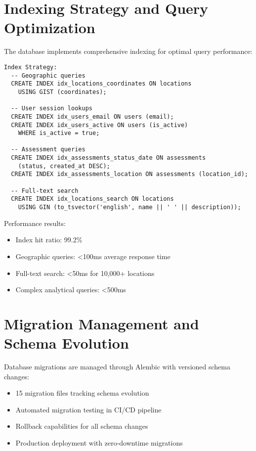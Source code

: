 \documentclass[a4paper,12pt,oneside]{book}
\begin{document}
\section{Indexing Strategy and Query Optimization}

The database implements comprehensive indexing for optimal query performance:

\begin{lstlisting}[language=Pseudocode, caption=Strategic Index Implementation]
Index Strategy:
  -- Geographic queries
  CREATE INDEX idx_locations_coordinates ON locations 
    USING GIST (coordinates);
  
  -- User session lookups  
  CREATE INDEX idx_users_email ON users (email);
  CREATE INDEX idx_users_active ON users (is_active) 
    WHERE is_active = true;
  
  -- Assessment queries
  CREATE INDEX idx_assessments_status_date ON assessments 
    (status, created_at DESC);
  CREATE INDEX idx_assessments_location ON assessments (location_id);
  
  -- Full-text search
  CREATE INDEX idx_locations_search ON locations 
    USING GIN (to_tsvector('english', name || ' ' || description));
\end{lstlisting}

Performance results:
\begin{itemize}
    \item Index hit ratio: 99.2\%
    \item Geographic queries: <100ms average response time
    \item Full-text search: <50ms for 10,000+ locations
    \item Complex analytical queries: <500ms
\end{itemize}

\section{Migration Management and Schema Evolution}

Database migrations are managed through Alembic with versioned schema changes:

\begin{itemize}
    \item 15 migration files tracking schema evolution
    \item Automated migration testing in CI/CD pipeline
    \item Rollback capabilities for all schema changes
    \item Production deployment with zero-downtime migrations
\end{itemize}
\end{document}
